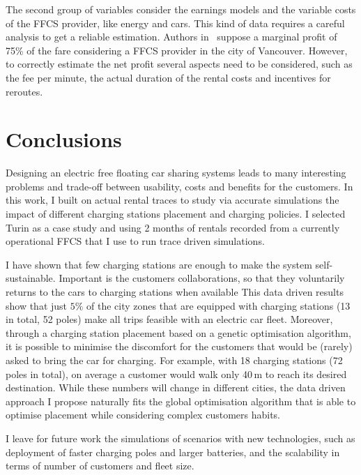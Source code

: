 The second group of variables consider the earnings models and the variable costs of the FFCS provider, like energy and cars. This kind of data requires a careful analysis to get a reliable estimation. Authors in~\cite{8_Wagner2015DataAF} suppose a marginal profit of 75\% of the fare considering a FFCS provider in the city of Vancouver. However, to correctly estimate the net profit several aspects need to be considered, such as the fee per minute, the actual duration of the rental costs and incentives for reroutes.


\section{Conclusions}
\label{sec:7_9_conclusion}

Designing an electric free floating car sharing systems leads to many interesting problems and trade-off between usability, costs and benefits for the customers. 
In this work, I built on actual rental traces to study via accurate simulations the impact of different charging stations placement and charging policies. 
I selected Turin as a case study and using 2 months of rentals recorded from a currently operational FFCS that I use to run trace driven simulations.


I have shown that few charging stations are enough to make the system self-sustainable. Important is the customers collaborations, so that they voluntarily returns to the cars to charging stations when available
This data driven results show that just $5\%$ of the city zones that are equipped with charging stations (13 in total, 52 poles) make all trips feasible with an electric car fleet. Moreover, through a charging station placement based on a genetic optimisation algorithm, it is possible to minimise the discomfort for the customers that would be (rarely) asked to bring the car for charging. For example, with 18 charging stations (72 poles in total), on average a customer would walk only 40\,m to reach its desired destination. While these numbers will change in different cities, the data driven approach I propose naturally fits the global optimisation algorithm that is able to optimise placement while considering complex customers habits.

I leave for future work the simulations of scenarios with new technologies, such as deployment of faster charging poles and larger batteries, and the scalability in terms of number of customers and fleet size.
